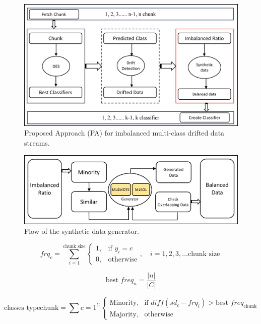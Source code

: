 \begin{figure}[!ht]
	\centering
	\includegraphics[width=1\linewidth]{4_Imbalanced/figures/approach_step_1.png}
	\caption{Proposed Approach (PA) for imbalanced multi-class drifted data streams.}
	\label{fig:4_first_proposal_step_1}
\end{figure}
\begin{figure}[!ht]
	\centering
	\includegraphics[width=1\linewidth]{4_Imbalanced/figures/approach_step_2.png}
	\caption{Flow of the synthetic data generator.}
	\label{fig:4_first_proposal_step_2}
\end{figure}

\begin{equation}
	\label{eq:4_first_proposal_1}
    frq_{c} = \sum_{i=1}^{\text{chunk size}} \begin{cases} 
    1, & \text{if } y_i = c \\
    0, & \text{otherwise}
    \end{cases}, \quad i = 1, 2, 3, \dots \text{chunk size}\;
\end{equation}

\begin{equation}
	\label{eq:4_first_proposal_2}
    \text{best } freq_{n} = \frac{|n|}{|C|}
\end{equation}

\begin{equation}
	\label{eq:4_first_proposal_3}
    \text{classes type}{\text{chunk}} = \sum{c=1}^{C} \begin{cases} 
    \text{Minority,} & \text{if } diff(sd_c - frq_i) > \text{best } freq_{\text{chunk}} \\
    \text{Majority,} & \text{otherwise}
    \end{cases}
\end{equation}


